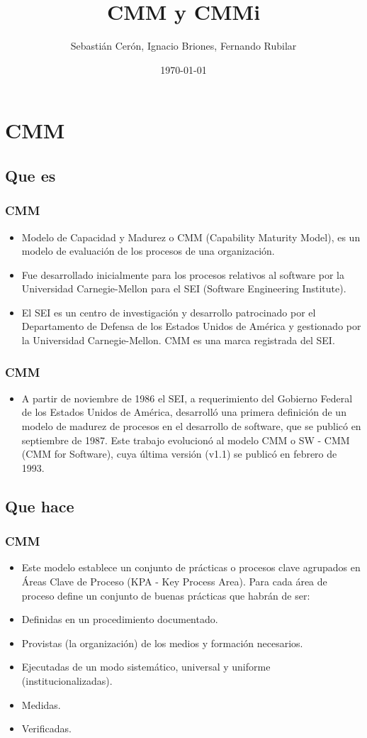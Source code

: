 \documentclass{beamer}
\title{CMM y CMMi}
\author{Sebastián Cerón, Ignacio Briones, Fernando Rubilar}
\date{\today}
\begin{document}
\frame{\titlepage}

\section[Índice]{}
\frame{\tableofcontents}
\section{CMM}
\subsection{Que es}

\frame
{
  \frametitle{CMM}
  \begin{itemize}
    \item<1-> Modelo de Capacidad y Madurez o CMM (Capability Maturity Model), es un modelo de evaluación de los procesos de una organización. 
    \item<2-> Fue desarrollado inicialmente para los procesos relativos al software por la Universidad Carnegie-Mellon para el SEI (Software Engineering Institute).
    \item<3-> El SEI es un centro de investigación y desarrollo patrocinado por el Departamento de Defensa de los Estados Unidos de América y gestionado por la Universidad Carnegie-Mellon. CMM es una marca registrada del SEI.
  \end{itemize}
}

\frame
{
  \frametitle{CMM}
  \begin{itemize}
    \item<1-> A partir de noviembre de 1986 el SEI, a requerimiento del Gobierno Federal de los Estados Unidos de América, desarrolló una primera definición de un modelo de madurez de procesos en el desarrollo de software, que se publicó en septiembre de 1987. Este trabajo evolucionó al modelo CMM o SW - CMM (CMM for Software), cuya última versión (v1.1) se publicó en febrero de 1993.
  \end{itemize}
}

\subsection{Que hace}

\frame
{
  \frametitle{CMM}
  \begin{itemize}
    \item<1-> Este modelo establece un conjunto de prácticas o procesos clave agrupados en Áreas Clave de Proceso (KPA - Key Process Area). Para cada área de proceso define un conjunto de buenas prácticas que habrán de ser:
    \item<2-> Definidas en un procedimiento documentado.
    \item<3-> Provistas (la organización) de los medios y formación necesarios.
    \item<4-> Ejecutadas de un modo sistemático, universal y uniforme (institucionalizadas).
    \item<5-> Medidas.
    \item<6-> Verificadas.
  \end{itemize}
}
\end{document}
